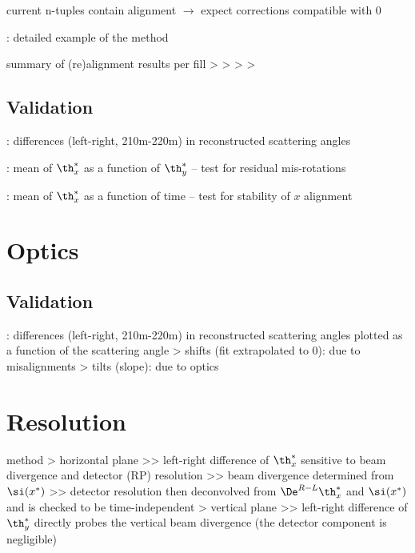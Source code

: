 \> current n-tuples contain alignment $\rightarrow$ expect corrections compatible with 0

\> : detailed example of the method

\> summary of (re)alignment results per fill
\>> 
\>> 
\>> 
\>> 


\subsection{Validation}

\> : differences (left-right, 210m-220m) in reconstructed scattering angles

\> : mean of $\th_x^*$ as a function of $\th_y^*$ -- test for residual mis-rotations

\> :  mean of $\th_x^*$ as a function of time -- test for stability of $x$ alignment



\section{Optics}

\subsection{Validation}

\> : differences (left-right, 210m-220m) in reconstructed scattering angles plotted as a function of the scattering angle
\>> shifts (fit extrapolated to 0): due to misalignments
\>> tilts (slope): due to optics



\section{Resolution}

\> method
\>> horizontal plane
\>>> left-right difference of $\th_x^*$ sensitive to beam divergence and detector (RP) resolution
\>>> beam divergence determined from $\si(x^*)$
\>>> detector resolution then deconvolved from $\De^{R-L} \th_x^*$ and $\si(x^*)$ and is checked to be time-independent
\>> vertical plane
\>>> left-right difference of $\th_y^*$ directly probes the vertical beam divergence (the detector component is negligible)

